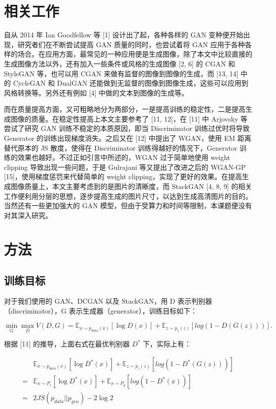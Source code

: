 \documentclass{article}
\begin{document}
\begin{CJK*}{UTF8}{gbsn}
\section{相关工作}

  自从 2014 年 Ian Goodfellow 等 [1] 设计出了起，各种各样的 GAN 变种便开始出现，研究者们在不断尝试提高 GAN 质量的同时，也尝试着将 GAN 应用于各种各样的场合。在应用方面，最常见的一种应用便是生成图像，除了本文中比较直接的生成图像方法以外，还有加入一些条件或风格的生成图像 [2, 6] 的 CGAN 和 StyleGAN 等，也可以用 CGAN 来做有监督的图像到图像的生成，而 [13, 14] 中的 CycleGAN 和 DualGAN 还能做到无监督的图像到图像生成，这些可以应用到风格转换等。另外还有例如 [4] 中做的文本到图像的生成等。

  而在质量提高方面，又可粗略地分为两部分，一是提高训练的稳定性，二是提高生成图像的质量。在稳定性提高上本文主要参考了 [11, 12]，在 [11] 中 Arjovsky 等尝试了研究 GAN 训练不稳定的本质原因，即当 Discriminator 训练过优时将导致 Generator 的训练出现梯度消失。之后又在 [12] 中提出了 WGAN，使用 EM 距离替代原本的 JS 散度，使得在 Discriminator 训练得越好的情况下，Generator 训练的效果也越好。不过正如引言中所述的，WGAN 过于简单地使用 weight clipping 导致出现一些问题，于是 Gulrajani 等又提出了改进之后的 WGAN-GP [15]，使用梯度惩罚来代替简单的 weight clipping，实现了更好的效果。在提高生成图像质量上，本文主要考虑到的是图片的清晰度，而 StackGAN [4, 8, 9] 的相关工作便利用分层的思想，逐步提高生成的图片尺寸，以达到生成高清图片的目的。当然还有一些更加强大的 GAN 模型，但由于受算力和时间等限制，本课题便没有对其深入研究。

\section{方法}

  \subsection{训练目标}

    对于我们使用的 GAN、DCGAN 以及 StackGAN，用 D 表示判别器（discriminator），G 表示生成器（generator），训练目标如下：

    \begin{equation}
      \min_G\max_D V(D, G) = \mathbb{E}_{x\sim p_{data}(x)}[\log D(x)] + \mathbb{E}_{z\sim p_z(z)}[log(1-D(G(z)))].
    \end{equation}
    
    根据 [11] 的推导，上面右式在最优判别器 $D^*$ 下，实际上有：
    
    \begin{equation}
    \begin{aligned}
	  &\mathbb{E}_{x\sim p_{data}(x)}[\log D^*(x)] + \mathbb{E}_{z\sim p_z(z)}[log(1-D^*(G(z)))] \\
	  = &\mathbb{E}_{x\sim P_r}[\log D^*(x)] + \mathbb{E}_{x\sim P_g}[log(1-D^*(x))] \\
	  = &2JS(p_{data} || p_{gen}) - 2\log 2
	\end{aligned}
    \end{equation}


\end{CJK*}
\end{document}
